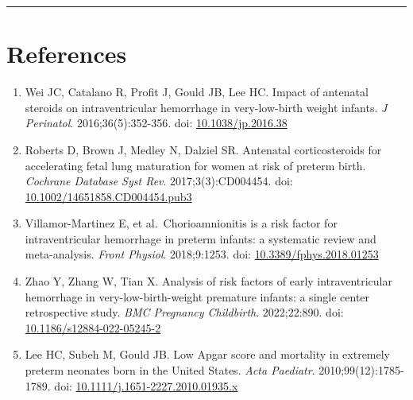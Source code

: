 \documentclass[
]{article}
\providecommand{\tightlist}{%
  \setlength{\itemsep}{0pt}\setlength{\parskip}{0pt}}
\begin{document}
\begin{center}\rule{0.5\linewidth}{0.5pt}\end{center}

\hypertarget{references}{%
\section{References}\label{references}}

\begin{enumerate}
\def\labelenumi{\arabic{enumi}.}
\tightlist
\item
  Wei JC, Catalano R, Profit J, Gould JB, Lee HC. Impact of antenatal
  steroids on intraventricular hemorrhage in very-low-birth weight
  infants. \emph{J Perinatol}. 2016;36(5):352-356. doi:
  \href{https://doi.org/10.1038/jp.2016.38}{10.1038/jp.2016.38}
\item
  Roberts D, Brown J, Medley N, Dalziel SR. Antenatal corticosteroids
  for accelerating fetal lung maturation for women at risk of preterm
  birth. \emph{Cochrane Database Syst Rev}. 2017;3(3):CD004454. doi:
  \href{https://doi.org/10.1002/14651858.CD004454.pub3}{10.1002/14651858.CD004454.pub3}
\item
  Villamor-Martinez E, et al.~Chorioamnionitis is a risk factor for
  intraventricular hemorrhage in preterm infants: a systematic review
  and meta-analysis. \emph{Front Physiol}. 2018;9:1253. doi:
  \href{https://doi.org/10.3389/fphys.2018.01253}{10.3389/fphys.2018.01253}
\item
  Zhao Y, Zhang W, Tian X. Analysis of risk factors of early
  intraventricular hemorrhage in very-low-birth-weight premature
  infants: a single center retrospective study. \emph{BMC Pregnancy
  Childbirth}. 2022;22:890. doi:
  \href{https://doi.org/10.1186/s12884-022-05245-2}{10.1186/s12884-022-05245-2}
\item
  Lee HC, Subeh M, Gould JB. Low Apgar score and mortality in extremely
  preterm neonates born in the United States. \emph{Acta Paediatr}.
  2010;99(12):1785-1789. doi:
  \href{https://doi.org/10.1111/j.1651-2227.2010.01935.x}{10.1111/j.1651-2227.2010.01935.x}
\end{enumerate}
\end{document}
